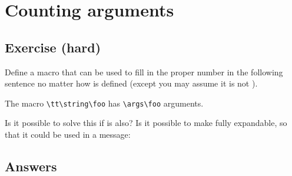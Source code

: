\chapter{Counting arguments}

\section{Exercise (hard)}

\begin{comment}
[Posted to info-tex on 4 Nov 91; see exercise.004]
**********************************************************************
*** Exercise 6 (hard):
\end{comment}


Define a macro \cmd{\args} that can be used to fill in the proper number
in the following sentence no matter how \cmd{\foo} is defined (except
you may assume it is not \cmd{\outer}).

     The macro \verb?\tt\string\foo? has \verb?\args\foo? arguments.

Is it possible to solve this if \cmd{\foo} is \cmd{\outer} also? Is it possible
to make \cmd{\args} fully expandable, so that it could be used in a
message:
\begin{lcode}
\end{lcode}


\section{Answers}

\begin{comment}
Date: Mon 23 Dec 91 11:46:33-EST
From: Michael Downes <MJD@MATH.AMS.COM>
Subject: Answers to 'Around the bend' #2 Exercise 6
To: info-tex@shsu.edu
X-ListName: TeX-Related Network Discussion List <INFO-TeX@SHSU.edu>

"*** Exercise 6 (hard):
"
"Define a macro \args that can be used to fill in the proper number
"in the following sentence no matter how \foo is defined (except
"you may assume it is not \outer).
"
"     The macro {\tt\string\foo} has {\args\foo} arguments.
"
"Is it possible to solve this if \foo is \outer also? Is it possible
"to make \args fully expandable, so that it could be used in a
"message:
"
"     \message{The macro \noexpand\foo has \args\foo\space arguments.}
\end{comment}

